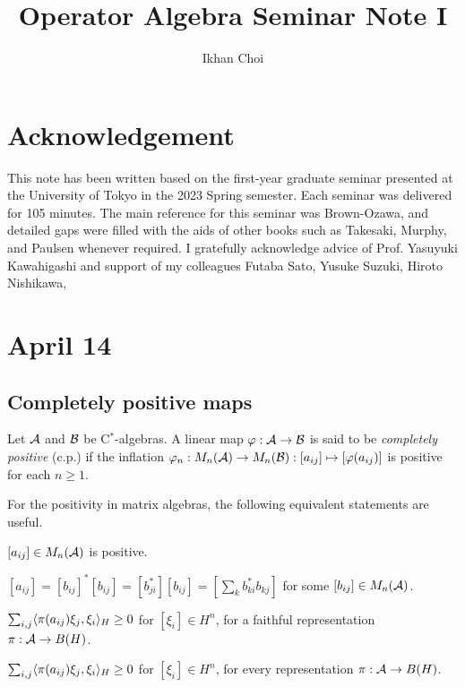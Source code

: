 \documentclass{../../../small}
\begin{document}
\title{Operator Algebra Seminar Note I}
\author{Ikhan Choi}
\maketitle
\tableofcontents


\section*{Acknowledgement}
This note has been written based on the first-year graduate seminar presented at the University of Tokyo in the 2023 Spring semester.
Each seminar was delivered for 105 minutes.
The main reference for this seminar was Brown-Ozawa, and detailed gaps were filled with the aids of other books such as Takesaki, Murphy, and Paulsen whenever required.
I gratefully acknowledge advice of Prof. Yasuyuki Kawahigashi and support of my colleagues Futaba Sato, Yusuke Suzuki, Hiroto Nishikawa, %



\newpage
\section{April 14}

\subsection{Completely positive maps}

\begin{defn}
Let $\mathcal{A}$ and $\mathcal{B}$ be C$^*$-algebras.
A linear map $\varphi:\mathcal{A}\to\mathcal{B}$ is said to be \emph{completely positive} (c.p.) if the inflation $\varphi_n:M_n(\mathcal{A})\to M_n(\mathcal{B}):[a_{ij}]\mapsto[\varphi(a_{ij})]$ is positive for each $n\ge1$.
\end{defn}

\begin{rmk}
For the positivity in matrix algebras, the following equivalent statements are useful.
\begin{parts}
\item $[a_{ij}]\in M_n(\mathcal{A})$ is positive.
\item $[a_{ij}]=[b_{ij}]^*[b_{ij}]=[b_{ji}^*][b_{ij}]=[\sum_kb_{ki}^*b_{kj}]$ for some $[b_{ij}]\in M_n(\mathcal{A})$.
\item $\sum_{i,j}\langle\pi(a_{ij})\xi_j,\xi_i\rangle_H\ge0$ for $[\xi_i]\in H^n$, for a faithful representation $\pi:\mathcal{A}\to B(H)$.
\item $\sum_{i,j}\langle\pi(a_{ij})\xi_j,\xi_i\rangle_H\ge0$ for $[\xi_i]\in H^n$, for every representation $\pi:\mathcal{A}\to B(H)$.
\end{parts}
\end{rmk}
\end{document}
